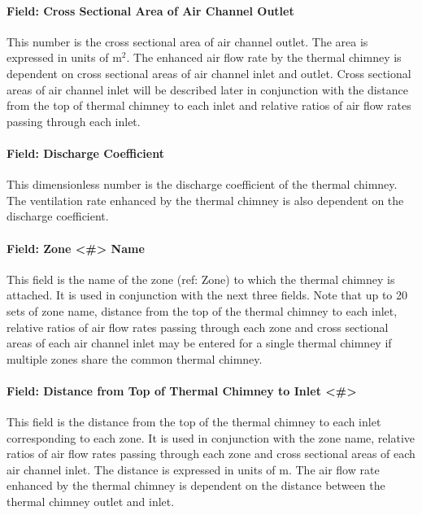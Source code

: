 \paragraph{Field: Cross Sectional Area of Air Channel Outlet}\label{field-cross-sectional-area-of-air-channel-outlet}

This number is the cross sectional area of air channel outlet. The area is expressed in units of m\(^{2}\). The enhanced air flow rate by the thermal chimney is dependent on cross sectional areas of air channel inlet and outlet. Cross sectional areas of air channel inlet will be described later in conjunction with the distance from the top of thermal chimney to each inlet and relative ratios of air flow rates passing through each inlet.

\paragraph{Field: Discharge Coefficient}\label{field-discharge-coefficient-000}

This dimensionless number is the discharge coefficient of the thermal chimney. The ventilation rate enhanced by the thermal chimney is also dependent on the discharge coefficient.

\paragraph{Field: Zone \textless{}\#\textgreater{} Name}\label{field-zone-name-8}

This field is the name of the zone (ref: Zone) to which the thermal chimney is attached. It is used in conjunction with the next three fields. Note that up to 20 sets of zone name, distance from the top of the thermal chimney to each inlet, relative ratios of air flow rates passing through each zone and cross sectional areas of each air channel inlet may be entered for a single thermal chimney if multiple zones share the common thermal chimney.

\paragraph{Field: Distance from Top of Thermal Chimney to Inlet \textless{}\#\textgreater{}}\label{field-distance-from-top-of-thermal-chimney-to-inlet}

This field is the distance from the top of the thermal chimney to each inlet corresponding to each zone. It is used in conjunction with the zone name, relative ratios of air flow rates passing through each zone and cross sectional areas of each air channel inlet. The distance is expressed in units of m. The air flow rate enhanced by the thermal chimney is dependent on the distance between the thermal chimney outlet and inlet.

